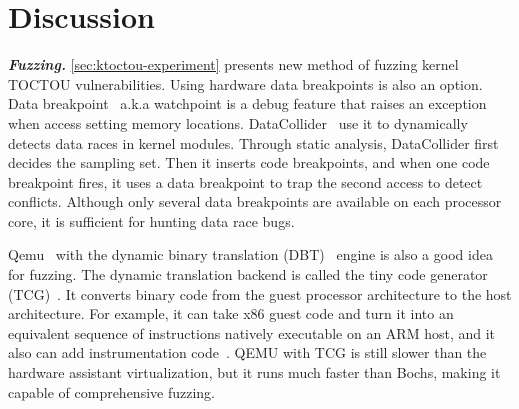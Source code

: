 
\section{Discussion}
\label{sec:ktoctou-discussion}


\textbf{\textit{Fuzzing.}} \autoref{sec:ktoctou-experiment} presents new method of fuzzing kernel TOCTOU vulnerabilities. Using hardware data breakpoints is also an option. Data breakpoint~\cite{krishnan2009hardware} a.k.a watchpoint is a debug feature that raises an exception when access setting memory locations.  DataCollider~\cite{krishnan2009hardware} use it to dynamically detects data races in kernel modules. Through static analysis,  DataCollider first decides the sampling set. Then it inserts code breakpoints, and when one code breakpoint fires, it uses a data breakpoint to trap the second access to detect conflicts. Although only several data breakpoints are available on each processor core, it is sufficient for hunting data race bugs.


Qemu~\cite{bellard2005qemu} with the dynamic binary translation (DBT)~\cite{ebcioglu2001dynamic} engine is also a good idea for fuzzing. The dynamic translation backend is called the tiny code generator (TCG)~\cite{bellard2009tiny}.  It converts binary code from the guest processor architecture to the host architecture. For example, it can take x86 guest code and turn it into an equivalent sequence of instructions natively executable on an ARM host, and it also can add instrumentation code~\cite{quynh2015unicorn}. QEMU with TCG is still slower than the hardware assistant virtualization, but it runs much faster than Bochs, making it capable of comprehensive fuzzing.





